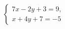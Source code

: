 \begin{ex}[type=eq_system]
	\begin{condition}
		\( \left\{
		\begin{array}{l}
			7x-2y+3=9,\\
			x+4y+7=-5
		\end{array}
		\right. \)
	\end{condition}
\end{ex}